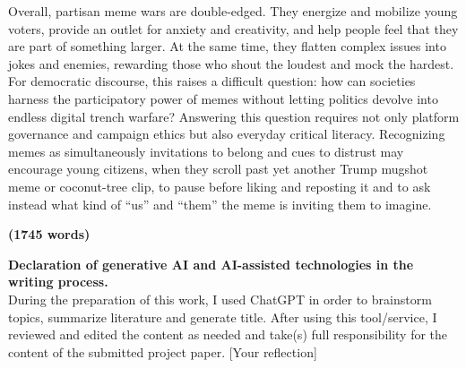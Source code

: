 \documentclass[12pt,twoside]{article}
\begin{document}

Overall, partisan meme wars are double-edged. They energize and mobilize young voters, provide an outlet for anxiety and creativity, and help people feel that they are part of something larger. At the same time, they flatten complex issues into jokes and enemies, rewarding those who shout the loudest and mock the hardest. For democratic discourse, this raises a difficult question: how can societies harness the participatory power of memes without letting politics devolve into endless digital trench warfare? Answering this question requires not only platform governance and campaign ethics but also everyday critical literacy. Recognizing memes as simultaneously invitations to belong and cues to distrust may encourage young citizens, when they scroll past yet another Trump mugshot meme or coconut-tree clip, to pause before liking and reposting it and to ask instead what kind of ``us'' and ``them'' the meme is inviting them to imagine.

\vspace{-2\baselineskip}

\begin{flushright}\textbf{(1745 words)}\end{flushright}

\vspace{-\baselineskip}

\textbf{Declaration of generative AI and AI-assisted technologies in the writing process.}\\
During the preparation of this work, I used ChatGPT in order to brainstorm topics, summarize literature and generate title.
After using this tool/service, I reviewed and edited the content as needed and take(s) full responsibility for the content of the submitted project paper.
[Your reflection]

\vspace{\baselineskip}

\printbibliography[heading=normalrefs,title={References}]
\end{document}
